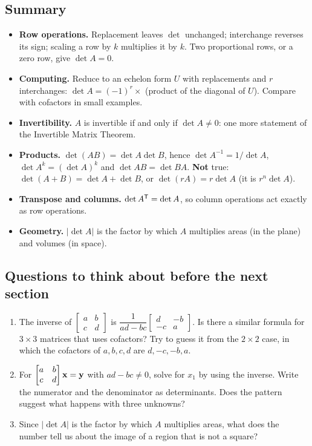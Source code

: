 \documentclass[11pt]{article}
\begin{document}
\subsection*{Summary}
\begin{itemize}
  \item \textbf{Row operations.} Replacement leaves $\det$ unchanged; interchange reverses its sign; scaling a row by $k$ multiplies it by $k$. Two proportional rows, or a zero row, give $\det A=0$.
  \item \textbf{Computing.} Reduce to an echelon form $U$ with replacements and $r$ interchanges: $\det A=(-1)^r\times$ (product of the diagonal of $U$). Compare with cofactors in small examples.
  \item \textbf{Invertibility.} $A$ is invertible if and only if $\det A\neq0$: one more statement of the Invertible Matrix Theorem.
  \item \textbf{Products.} $\det(AB)=\det A\det B$, hence $\det A^{-1}=1/\det A$, $\det A^k=(\det A)^k$ and $\det AB=\det BA$. \textbf{Not} true: $\det(A+B)=\det A+\det B$, or $\det(rA)=r\det A$ (it is $r^n\det A$).
  \item \textbf{Transpose and columns.} $\det A^{\mathsf T}=\det A$, so column operations act exactly as row operations.
  \item \textbf{Geometry.} $|\det A|$ is the factor by which $A$ multiplies areas (in the plane) and volumes (in space).
\end{itemize}

\subsection*{Questions to think about before the next section}
\begin{enumerate}
  \item The inverse of $\begin{bmatrix}a&b\\c&d\end{bmatrix}$ is $\dfrac1{ad-bc}\begin{bmatrix}d&-b\\-c&a\end{bmatrix}$. Is there a similar formula for $3\times3$ matrices that uses cofactors? Try to guess it from the $2\times2$ case, in which the cofactors of $a,b,c,d$ are $d,-c,-b,a$.
  \item For $\begin{bmatrix}a&b\\c&d\end{bmatrix}\mathbf{x}=\mathbf{y}$ with $ad-bc\neq0$, solve for $x_1$ by using the inverse. Write the numerator and the denominator as determinants. Does the pattern suggest what happens with three unknowns?
  \item Since $|\det A|$ is the factor by which $A$ multiplies areas, what does the number tell us about the image of a region that is not a square?
\end{enumerate}
\end{document}
